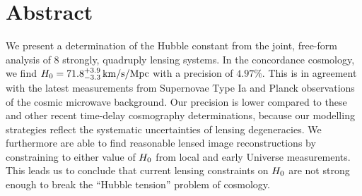 
\clearpage


\newcommand{\Hres}{\ensuremath{71.8^{+3.9}_{-3.3}\,\Hunits{}}}
\newcommand{\HaHzres}{\ensuremath{2.33^{+0.13}_{-0.11}\,\mathrm{aHz}}}
\newcommand{\invHres}{\ensuremath{13.7^{+0.7}_{-0.7}\,\Gyrs{}}}
\newcommand{\rhocritres}{\ensuremath{5.4^{+0.6}_{-0.5}\,\GeVmcube{}}}
\newcommand{\tref}[1]{\hyperlink{tr#1}{(#1)}}
\newcommand{\tlink}[1]{\hypertarget{tr#1}{(#1)}}
\def\twidth{.59\textwidth}
\def\theight{.59\textheight}
\def\pwidth{.49\textwidth}
\def\pheight{.49\textheight}
\def\qwidth{.49\textwidth}
\def\qheight{.24\textheight}


\section*{Abstract}
  \noindent 
  We present a determination of the Hubble constant from the joint, free-form
  analysis of 8 strongly, quadruply lensing systems.  
  In the concordance cosmology, we find $\Ho{} = \Hres{}$ with a precision of
  $4.97\%$.  This is in agreement with the latest measurements from Supernovae
  Type Ia and Planck observations of the cosmic microwave background.  
  Our precision is lower compared to these and other recent time-delay
  cosmography determinations, because our modelling strategies reflect the
  systematic uncertainties of lensing degeneracies.  We furthermore are able to
  find reasonable lensed image reconstructions by constraining to either value
  of $H_{0}$ from local and early Universe measurements.  This leads us to
  conclude that current lensing constraints on $H_{0}$ are not strong enough to
  break the ``Hubble tension'' problem of cosmology.


  \clearpage
  
